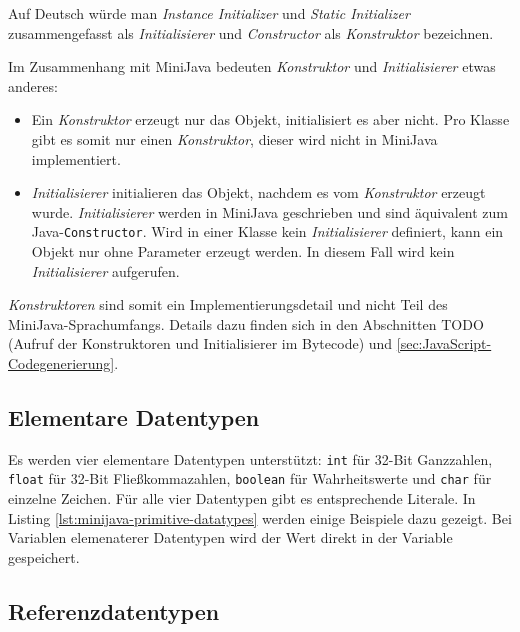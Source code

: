 

Auf Deutsch würde man \emph{Instance Initializer} und \emph{Static Initializer} zusammengefasst als \emph{Initialisierer} und \emph{Constructor} als \emph{Konstruktor} bezeichnen.

Im Zusammenhang mit MiniJava bedeuten \emph{Konstruktor} und \emph{Initialisierer} etwas anderes:
\begin{itemize}
    \item Ein \emph{Konstruktor} erzeugt nur das Objekt, initialisiert es aber nicht. Pro Klasse gibt es somit nur einen \emph{Konstruktor}, dieser wird nicht in MiniJava implementiert. 
    \item \emph{Initialisierer} initialieren das Objekt, nachdem es vom \emph{Konstruktor} erzeugt wurde. \emph{Initialisierer} werden in MiniJava geschrieben und sind äquivalent zum Java-\lstinline{Constructor}. Wird in einer Klasse kein \emph{Initialisierer} definiert, kann ein Objekt nur ohne Parameter erzeugt werden. In diesem Fall wird kein \emph{Initialisierer} aufgerufen.
\end{itemize}

\emph{Konstruktoren} sind somit ein Implementierungsdetail und nicht Teil des MiniJava-Sprachumfangs. Details dazu finden sich in den Abschnitten TODO (Aufruf der Konstruktoren und Initialisierer im Bytecode) und \ref{sec:JavaScript-Codegenerierung}.

\subsection{Elementare Datentypen}

Es werden vier elementare Datentypen unterstützt: \lstinline{int} für 32-Bit Ganzzahlen, \lstinline{float} für 32-Bit Fließkommazahlen, \lstinline{boolean} für Wahrheitswerte und \lstinline{char} für einzelne Zeichen. Für alle vier Datentypen gibt es entsprechende Literale. In Listing \ref{lst:minijava-primitive-datatypes} werden einige Beispiele dazu gezeigt. Bei Variablen elemenaterer Datentypen wird der Wert direkt in der Variable gespeichert.



\subsection{Referenzdatentypen}

